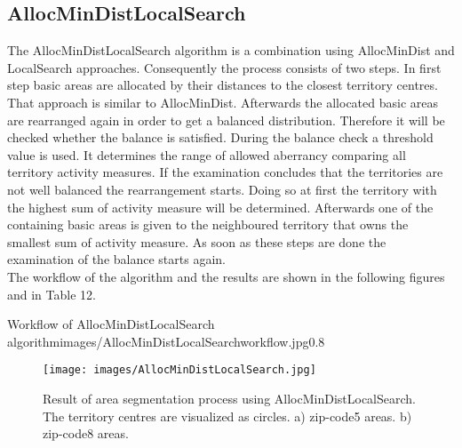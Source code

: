 \subsection{AllocMinDistLocalSearch}
The AllocMinDistLocalSearch algorithm is a combination using AllocMinDist and LocalSearch approaches. Consequently the process consists of two steps. In first step basic areas are allocated by their distances to the closest territory centres. That approach is similar to AllocMinDist. Afterwards the allocated basic areas are rearranged again in order to get a balanced distribution. Therefore it will be checked whether the balance is satisfied. During the balance check a threshold value is used. It determines the range of allowed aberrancy comparing all territory activity measures. If the examination concludes that the territories are not well balanced the rearrangement starts. Doing so at first the territory with the highest sum of activity measure will be determined. Afterwards one of the containing basic areas is given to the neighboured territory that owns the smallest sum of activity measure. As soon as these steps are done the examination of the balance starts again.\\
The workflow of the algorithm and the results are shown in the following figures and in Table 12.

\begin{figurevarSize}{Workflow of AllocMinDistLocalSearch algorithm}{images/AllocMinDistLocalSearchworkflow.jpg}{0.8}\end{figurevarSize}

\begin{figure}[H]
	\centering
	\texttt{[image: images/AllocMinDistLocalSearch.jpg]}
	\caption[Result of area segmentation process using AllocMinDistLocalSearch.]{Result of area segmentation process using AllocMinDistLocalSearch. The territory centres are visualized as circles. a) zip-code5 areas. b) zip-code8 areas.}
\end{figure}



